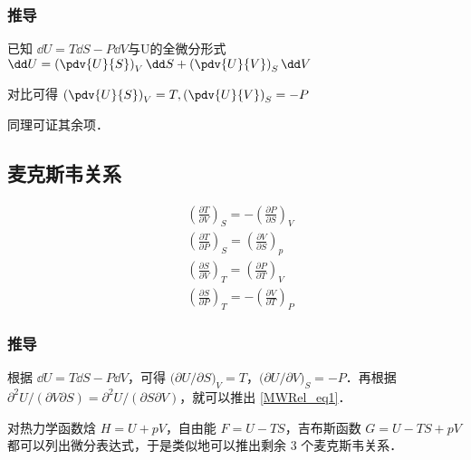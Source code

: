 \subsubsection{推导}
已知 $\dd U = T \dd S - P \dd V$与U的全微分形式 $\dd U = \left(\pdv{U}{S}\right)_V \dd S+\left(\pdv{U}{V}\right)_S \dd V$

对比可得 $\left(\pdv{U}{S}\right)_V=T, \left(\pdv{U}{V}\right)_S=-P$

同理可证其余项．

\subsection{麦克斯韦关系}

\begin{align}
&\left(\frac{\partial T}{\partial V}\right)_S=-\left(\frac{\partial P}{\partial S}\right)_V\label{MWRel_eq1}
\\
&\left(\frac{\partial T}{\partial P}\right)_S=\left(\frac{\partial V}{\partial S}\right)_p
\\
&\left(\frac{\partial S}{\partial V}\right)_T=\left(\frac{\partial P}{\partial T}\right)_V
\\
&\left(\frac{\partial S}{\partial P}\right)_T=-\left(\frac{\partial V}{\partial T}\right)_P
\end{align}

\subsubsection{推导}
根据 $\dd U=T\dd S-P\dd V$，可得 $\Big(\partial U/\partial S\Big)_V=T$，$\Big(\partial U/\partial V\Big)_S=-P$．再根据 $\partial^2 U/(\partial V\partial S)=\partial^2 U/(\partial S\partial V)$，就可以推出 \autoref{MWRel_eq1}．

对热力学函数焓 $H=U+pV$，自由能 $F=U-TS$，吉布斯函数 $G=U-TS+pV$ 都可以列出微分表达式，于是类似地可以推出剩余 $3$ 个麦克斯韦关系．

